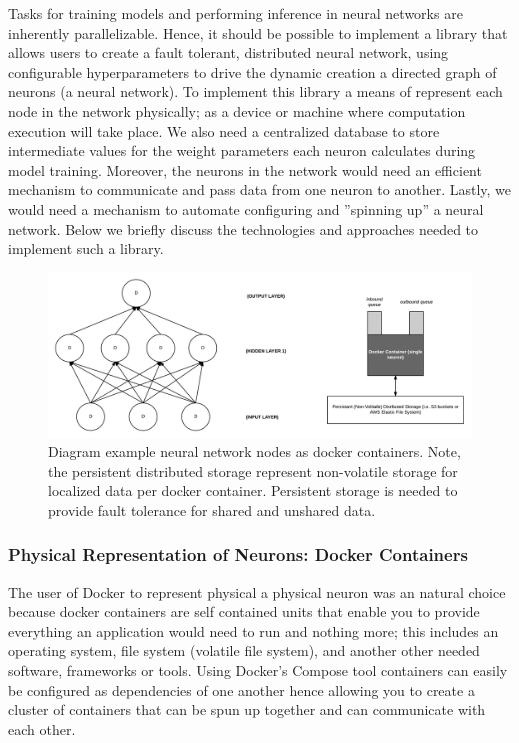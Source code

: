 \documentclass[conference]{IEEEtran}
\begin{document}
Tasks for training models and performing inference in neural networks are inherently parallelizable. Hence, it should be possible to implement a library that allows users to create a fault tolerant, distributed neural network, using configurable hyperparameters to drive the dynamic creation a directed graph of neurons (a neural network).  To implement this library a means of represent each node in the network physically; as a device or machine where computation execution will take place. We also need a centralized database to store intermediate values for the weight parameters each neuron calculates during model training. Moreover, the neurons in the network would need an efficient mechanism to communicate and pass data from one neuron to another. Lastly, we would need a mechanism to automate configuring and ''spinning up'' a neural network.  Below we briefly discuss the technologies and approaches needed to implement such a library.

\begin{figure}
  \includegraphics[width=\textwidth]{ml_figure_draft.png}
  \caption{Diagram example neural network nodes as docker containers. Note, the persistent distributed storage represent non-volatile storage for localized data per docker container. Persistent storage is needed to provide fault tolerance for shared and unshared data.}
\end{figure}

\subsubsection{Physical Representation of Neurons: Docker Containers}
The user of Docker to represent physical a physical neuron was an natural choice because docker containers are self contained units that enable you to provide everything an application would need to run and nothing more; this includes an operating system, file system (volatile file system), and another other needed software, frameworks or tools. Using Docker's Compose tool \cite{docker-compose-doc} containers can easily be configured as dependencies of one another hence allowing you to create a cluster of containers that can be spun up together and can communicate with each other.
\end{document}
